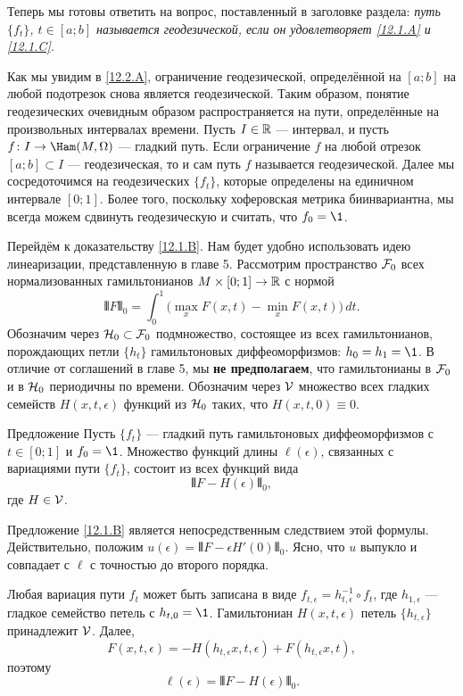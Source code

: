 Теперь мы готовы ответить на вопрос, поставленный в заголовке раздела:
\emph{путь $\{f_t\}$, $t\in[a; b]$ называется
  геодезической, если он удовлетворяет \ref{12.1.A} и \ref{12.1.C}.} 

Как мы увидим в \ref{12.2.A}, ограничение геодезической, определённой
на $[a; b]$ на любой подотрезок снова является геодезической. 
Таким образом, понятие геодезических очевидным образом
распространяется на пути, определённые на произвольных интервалах
времени. 
Пусть $I\in \mathbb{R}$ — интервал, и пусть $f\: I\to\Ham(M,\Omega)$ — гладкий путь.
Если ограничение $f$ на любой отрезок $[a; b] \subset I$ —
геодезическая, то и сам путь $f$ называется геодезической. 
Далее мы сосредоточимся на геодезических $\{f_t\}$, которые определены
на единичном интервале $[0; 1]$. 
Более того, поскольку хоферовская метрика биинвариантна, мы всегда
можем сдвинуть геодезическую и считать, что $f_0 = \1$.  

Перейдём к доказательству \ref{12.1.B}.
Нам будет удобно использовать идею линеаризации, представленную в главе 5.
Рассмотрим пространство $\mathcal{F}_0$ всех
нормализованных гамильтонианов $M \times [0; 1] \to \mathbb{R}$ с нормой
\[\VERT F \VERT_0 = \int_0^1 \big(\max_x F(x,t) - \min_x F(x,t)\big)\, dt.\]
Обозначим через $\mathcal{H}_0 \subset \mathcal{F}_0$ подмножество,
состоящее из всех гамильтонианов, порождающих петли $\{h_t\}$
гамильтоновых диффеоморфизмов: $h_0 = h_1 = \1$.
В отличие от соглашений в главе 5,
мы \textbf{не предполагаем}, что гамильтонианы в $\mathcal{F}_0$ и в $\mathcal{H}_0$
периодичны по времени. 
Обозначим через \index[symb]{$\V$}$\V$ множество всех гладких семейств
$H(x, t, \epsilon)$ функций из $\mathcal{H}_0$ таких, что $H(x, t, 0) \equiv
0$. 

\begin{thm}{Предложение}\label{12.1.E}
Пусть $\{f_t\}$ — гладкий путь гамильтоновых диффеоморфизмов с $t
\in [0; 1]$ и $f_0 = \1$. 
Множество функций длины $\ell(\epsilon)$, связанных с вариациями пути $\{f_t\}$, состоит из всех функций вида 
\[\VERT F - H(\epsilon)\VERT_0,\]
где $H\in\mathcal{V}$.
\end{thm}

Предложение \ref{12.1.B} является непосредственным следствием этой формулы.
Действительно, положим $u(\epsilon) = \VERT F - \epsilon H'(0)\VERT_0$.
Ясно, что $u$ выпукло и совпадает с $\ell$ с точностью до второго порядка.

Любая вариация пути $f_t$ может быть записана в виде $f_{t,\epsilon} = h_{t,\epsilon}^{-1}\circ f_t$, где $h_{1,\epsilon}$ — гладкое семейство петель с $h_{t,0} = \1$.
Гамильтониан $H(x,t,\epsilon)$ петель $\{h_{t,\epsilon}\}$ принадлежит $\V$.
Далее, 
\[F(x, t, \epsilon) = -H(h_{t,\epsilon}x, t, \epsilon) + F(h_{t,\epsilon}x, t),\]
поэтому
\[\ell(\epsilon) = \VERT F - H(\epsilon)\VERT_0.\]
\qeds

